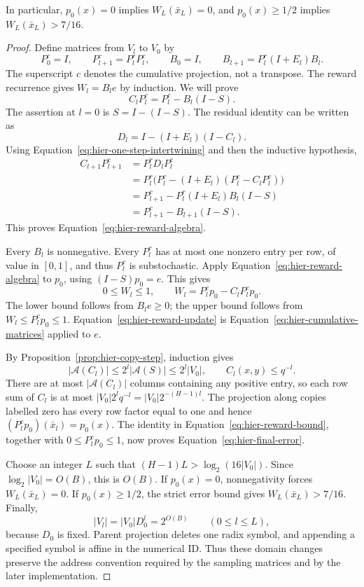 In particular, $p_0(x)=0$ implies $W_L(\bar x_L)=0$, and
$p_0(x)\ge1/2$ implies $W_L(\bar x_L)>7/16$.

\begin{proof}
Define matrices from $V_l$ to $V_0$ by
\begin{equation}
 P_0^c=I,\qquad P_{l+1}^c=P_l^rP_l^c,
 \qquad B_0=I,\qquad B_{l+1}=P_l^r(I+E_l)B_l.
 \label{eq:hier-cumulative-matrices}
\end{equation}
The superscript $c$ denotes the cumulative projection, not a transpose.
The reward recurrence gives $W_l=B_le$ by induction. We will prove
\begin{equation}
 C_lP_l^c=P_l^c-B_l(I-S).
 \label{eq:hier-reward-algebra}
\end{equation}
The assertion at $l=0$ is $S=I-(I-S)$.  The residual identity can be
written as
\[
 D_l=I-(I+E_l)(I-C_l).
\]
Using Equation~\eqref{eq:hier-one-step-intertwining} and then the
inductive hypothesis,
\begin{align*}
 C_{l+1}P_{l+1}^c
 &=P_l^rD_lP_l^c\\
 &=P_l^r\bigl(P_l^c-(I+E_l)(P_l^c-C_lP_l^c)\bigr)\\
 &=P_{l+1}^c-P_l^r(I+E_l)B_l(I-S)\\
 &=P_{l+1}^c-B_{l+1}(I-S).
\end{align*}
This proves Equation~\eqref{eq:hier-reward-algebra}.

Every $B_l$ is nonnegative.  Every $P_l^r$ has at most one nonzero
entry per row, of value in $[0,1]$, and thus $P_l^c$ is
substochastic.  Apply Equation~\eqref{eq:hier-reward-algebra} to
$p_0$, using $(I-S)p_0=e$. This gives
\begin{equation}
 0\leq W_l\leq1,\qquad
 W_l=P_l^cp_0-C_lP_l^cp_0.
 \label{eq:hier-reward-bound}
\end{equation}
The lower bound follows from $B_le\geq0$; the upper bound follows from
$W_l\leq P_l^cp_0\leq1$. Equation~\eqref{eq:hier-reward-update}
is Equation~\eqref{eq:hier-cumulative-matrices} applied to $e$.

By Proposition~\ref{prop:hier-copy-step}, induction gives
\[
 |\mathcal A(C_l)|\leq2^l|\mathcal A(S)|\leq2^l|V_0|,
 \qquad C_l(x,y)\leq q^{-l}.
\]
There are at most $|\mathcal A(C_l)|$ columns containing any positive
entry, so each row sum of $C_l$ is at most
$|V_0|2^lq^{-l}=|V_0|2^{-(H-1)l}$.
The projection along copies labelled zero has every row factor equal to one and hence
$(P_l^cp_0)(\bar x_l)=p_0(x)$.  The identity in
Equation~\eqref{eq:hier-reward-bound}, together with
$0\leq P_l^cp_0\leq1$, now proves
Equation~\eqref{eq:hier-final-error}.

Choose an integer $L$ such that
$(H-1)L>\log_2(16|V_0|)$.  Since $\log_2|V_0|=O(B)$, this is
$O(B)$.  If $p_0(x)=0$, nonnegativity forces
$W_L(\bar x_L)=0$.  If $p_0(x)\geq1/2$, the strict error bound
gives $W_L(\bar x_L)>7/16$.  Finally,
\[
 |V_l|=|V_0|D_0^l=2^{O(B)}\qquad(0\leq l\leq L),
\]
because $D_0$ is fixed.  Parent projection deletes one radix symbol,
and appending a specified symbol is affine in the numerical ID.  Thus
these domain changes preserve the address convention required by the
sampling matrices and by the later implementation.
\end{proof}

